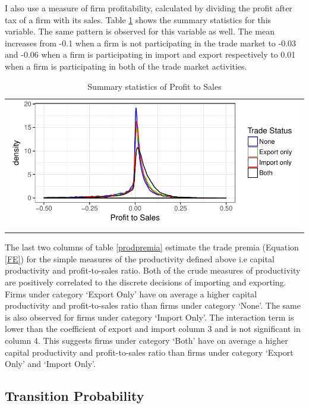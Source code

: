 \documentclass[12pt]{article}
\begin{document}
I also use a measure of firm profitability, calculated by dividing the profit
after tax of
a firm with its sales. Table \ref{tab:pts} shows the summary
statistics for this variable. The same pattern is observed for this variable as well. The mean increases from -0.1 when a firm is not participating in
the trade market to -0.03 and  -0.06 when a firm is participating in
import and export respectively to 0.01 when a firm is participating in
both of the trade market activities.  
   
\begin{center}
\begin{table}[H]
\caption{Summary statistics of Profit to Sales}
\label{tab:pts}
\begin{tabular}{c}
 \includegraphics{./PICS/denspatsales.pdf}   \\ 
   \\  
\end{tabular}
\end{table}
\end{center}


The last two columns of table \ref{prodpremia} estimate the trade
premia (Equation \ref{FE}) for the simple measures of the productivity defined above i.e
capital productivity and profit-to-sales ratio. Both
of the crude measures of productivity are positively correlated to the discrete
decisions of importing and exporting.  Firms under category `Export
Only' have on average a  higher
capital productivity and profit-to-sales ratio than firms under
category `None'. The same is also observed for firms under category
`Import Only'.  The interaction term is lower than the coefficient of export and
 import column 3 and 
is not significant in column 4. This suggests firms under category
`Both' have on average a higher capital productivity and profit-to-sales ratio than
firms under category `Export Only' and `Import Only'. 

\subsection{Transition Probability}
\end{document}
